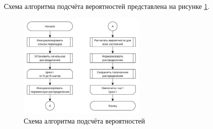 Схема алгоритма подсчёта вероятностей представлена на рисунке \ref{fig:prolog}.

\begin{figure}[h!btp]
	\centering
	\includegraphics[width=0.55\textwidth]{inc/prolog.pdf}
	\caption{Схема алгоритма подсчёта вероятностей}
	\label{fig:prolog}
\end{figure}

\clearpage